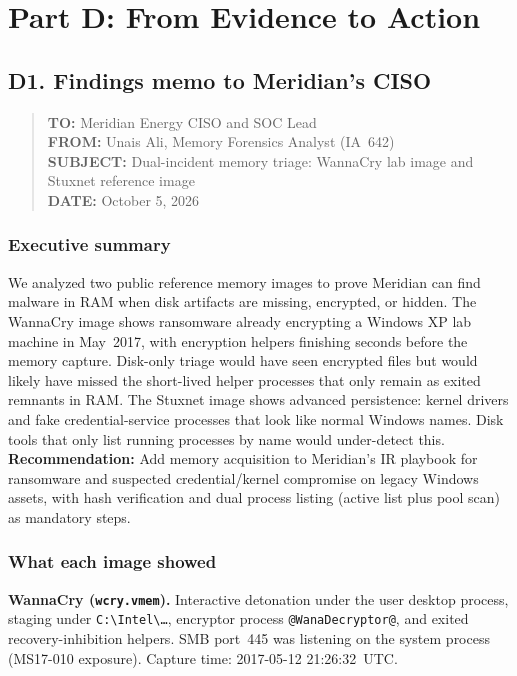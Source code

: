 \documentclass[11pt,letterpaper]{article}
\begin{document}
\section*{Part D: From Evidence to Action}
\subsection*{D1. Findings memo to Meridian's CISO}
\begin{quote}
\small
\textbf{TO:} Meridian Energy CISO and SOC Lead\\
\textbf{FROM:} Unais Ali, Memory Forensics Analyst (IA~642)\\
\textbf{SUBJECT:} Dual-incident memory triage: WannaCry lab image and Stuxnet reference image\\
\textbf{DATE:} October 5, 2026
\end{quote}

\subsubsection*{Executive summary}
We analyzed two public reference memory images to prove Meridian can find malware in RAM when disk
artifacts are missing, encrypted, or hidden. The WannaCry image shows ransomware already encrypting a
Windows XP lab machine in May~2017, with encryption helpers finishing seconds before the memory capture.
Disk-only triage would have seen encrypted files but would likely have missed the short-lived helper processes
that only remain as exited remnants in RAM. The Stuxnet image shows advanced persistence: kernel drivers and
fake credential-service processes that look like normal Windows names. Disk tools that only list running
processes by name would under-detect this. \textbf{Recommendation:} Add memory acquisition to Meridian's IR
playbook for ransomware and suspected credential/kernel compromise on legacy Windows assets, with hash
verification and dual process listing (active list plus pool scan) as mandatory steps.

\subsubsection*{What each image showed}
\textbf{WannaCry (\texttt{wcry.vmem}).}
 Interactive detonation under the user desktop process, staging under
\texttt{C:\textbackslash Intel\textbackslash\ldots}, encryptor process \texttt{@WanaDecryptor@}, and exited recovery-inhibition helpers.
SMB port~445 was listening on the system process (MS17-010 exposure). Capture time: 2017-05-12 21:26:32~UTC.
\end{document}

